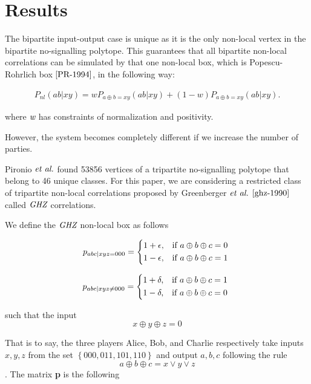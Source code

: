 \documentclass[aps,prl,twocolumn,groupedaddress]{revtex4}
\begin{document}
\section{Results}

The bipartite input-output case is unique as it is the only non-local vertex in the bipartite no-signalling polytope. This guarantees that all bipartite non-local correlations can be simulated by that one non-local box, which is Popescu-Rohrlich box $\cite{PR-1994}$, in the following way: 

\begin{eqnarray}
\label{intro:convex}
P_{nl}(ab|xy)= w P_{a \oplus b = xy}(ab|xy)+ (1-w) P_{a \oplus b = xy}(ab|xy).
\end{eqnarray}

where $\emph{w}$ has constraints of normalization and positivity.  

However, the system becomes completely different if we increase the number of parties. 

Pironio $\emph{et al.}$ found 53856 vertices of a tripartite no-signalling polytope that belong to 46 unique classes. For this paper, we are considering a restricted class of tripartite non-local correlations proposed by Greenberger $\emph{et al.}$ $\cite{ghz-1990}$ called $\emph{GHZ}$ correlations. 

We define the $\emph{GHZ}$ non-local box as follows

\[
    p_{abc|xyz=000}= 
\begin{dcases}
    1+\epsilon ,& \text{if } a \oplus b \oplus c = 0\\   
    1-\epsilon, & \text{if } a \oplus b \oplus c = 1\
\end{dcases}
\]


\[
    p_{abc|xyz \neq 000}= 
\begin{dcases}
    1+\delta ,& \text{if } a \oplus b \oplus c = 1\\     
    1-\delta, & \text{if } a \oplus b \oplus c = 0\
\end{dcases}
\]

such that the input \[x \oplus y \oplus z = 0\]

That is to say, the three players Alice, Bob, and Charlie respectively take inputs $x,y,z$ from the set $\left\{000,011,101,110\right\}$ and output $a,b,c$ following the rule \[ a \oplus b \oplus c = x \vee y \vee z \]. The matrix {\bf p} is the following
\end{document}
